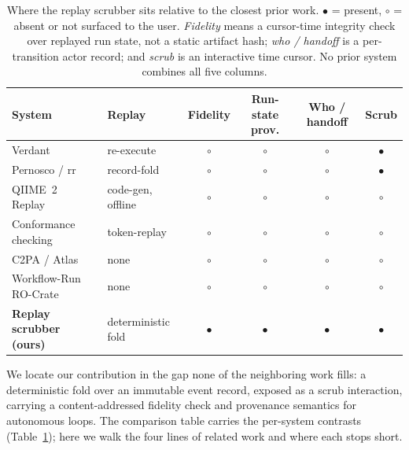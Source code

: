 
\begin{table}[t]
  \centering
  \caption{Where the replay scrubber sits relative to the closest prior work.
  $\bullet$ = present, $\circ$ = absent or not surfaced to the user.
  \emph{Fidelity} means a cursor-time integrity check over replayed run state,
  not a static artifact hash; \emph{who / handoff} is a per-transition actor
  record; and \emph{scrub} is an interactive time cursor. No prior system
  combines all five columns.}
  \label{tab:compare}
  \footnotesize
  \begin{tabular}{@{}llcccc@{}}
    \toprule
    System & Replay & Fidelity & Run-state prov. & Who / handoff & Scrub \\
    \midrule
    Verdant~\cite{verdant2018} & re-execute & $\circ$ & $\circ$ & $\circ$ & $\bullet$ \\
    Pernosco / rr~\cite{rr2017} & record-fold & $\circ$ & $\circ$ & $\circ$ & $\bullet$ \\
    QIIME~2 Replay~\cite{qiime2replay} & code-gen, offline & $\circ$ & $\circ$ & $\circ$ & $\circ$ \\
    Conformance checking~\cite{rozinat2008, pm4py} & token-replay & $\circ$ & $\circ$ & $\circ$ & $\circ$ \\
    C2PA / Atlas~\cite{c2pa, atlas2025} & none & $\circ$ & $\circ$ & $\circ$ & $\circ$ \\
    Workflow-Run RO-Crate~\cite{wrroc2024} & none & $\circ$ & $\circ$ & $\circ$ & $\circ$ \\
    \midrule
    \textbf{Replay scrubber (ours)} & deterministic fold & $\bullet$ & $\bullet$ & $\bullet$ & $\bullet$ \\
    \bottomrule
  \end{tabular}
\end{table}

We locate our contribution in the gap none of the neighboring work fills: a
deterministic fold over an immutable event record, exposed as a scrub
interaction, carrying a content-addressed fidelity check and provenance semantics
for autonomous loops. The comparison table carries the per-system contrasts
(Table~\ref{tab:compare}); here we walk the four lines of related work and where
each stops short.

